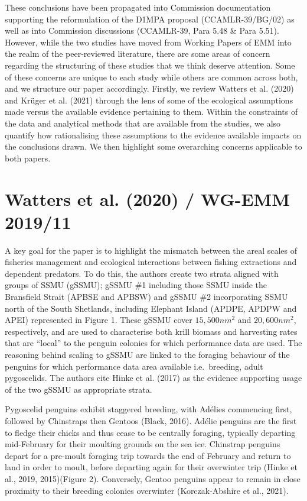 \documentclass[]{elsarticle} %
\begin{document}
These conclusions have been propagated into Commission documentation
supporting the reformulation of the D1MPA proposal (CCAMLR-39/BG/02) as
well as into Commission discussions (CCAMLR-39, Para 5.48 \& Para 5.51).
However, while the two studies have moved from Working Papers of EMM
into the realm of the peer-reviewed literature, there are some areas of
concern regarding the structuring of these studies that we think deserve
attention. Some of these concerns are unique to each study while others
are common across both, and we structure our paper accordingly. Firstly,
we review Watters et al. (2020) and Krüger et al. (2021) through the
lens of some of the ecological assumptions made versus the available
evidence pertaining to them. Within the constraints of the data and
analytical methods that are available from the studies, we also quantify
how rationalising these assumptions to the evidence available impacts on
the conclusions drawn. We then highlight some overarching concerns
applicable to both papers.

\hypertarget{watters2020-wg-emm-201911}{%
\section{Watters et al. (2020) / WG-EMM
2019/11}\label{watters2020-wg-emm-201911}}

A key goal for the paper is to highlight the mismatch between the areal
scales of fisheries management and ecological interactions between
fishing extractions and dependent predators. To do this, the authors
create two strata aligned with groups of SSMU (gSSMU); gSSMU \#1
including those SSMU inside the Bransfield Strait (APBSE and APBSW) and
gSSMU \#2 incorporating SSMU north of the South Shetlands, including
Elephant Island (APDPE, APDPW and APEI) represented in Figure 1. These
gSSMU cover \(15,500nm^2\) and \(20,600nm^2\), respectively, and are
used to characterise both krill biomass and harvesting rates that are
``local'' to the penguin colonies for which performance data are used.
The reasoning behind scaling to gSSMU are linked to the foraging
behaviour of the penguins for which performance data area available
i.e.~breeding, adult pygoscelids. The authors cite Hinke et al. (2017)
as the evidence supporting usage of the two gSSMU as appropriate strata.

Pygoscelid penguins exhibit staggered breeding, with Adélies commencing
first, followed by Chinstraps then Gentoos (Black, 2016). Adélie
penguins are the first to fledge their chicks and thus cease to be
centrally foraging, typically departing mid-February for their moulting
grounds on the sea ice. Chinstrap penguins depart for a pre-moult
foraging trip towards the end of February and return to land in order to
moult, before departing again for their overwinter trip (Hinke et al.,
2019, 2015)(Figure 2). Conversely, Gentoo penguins appear to remain in
close proximity to their breeding colonies overwinter (Korczak-Abshire
et al., 2021).
\end{document}
